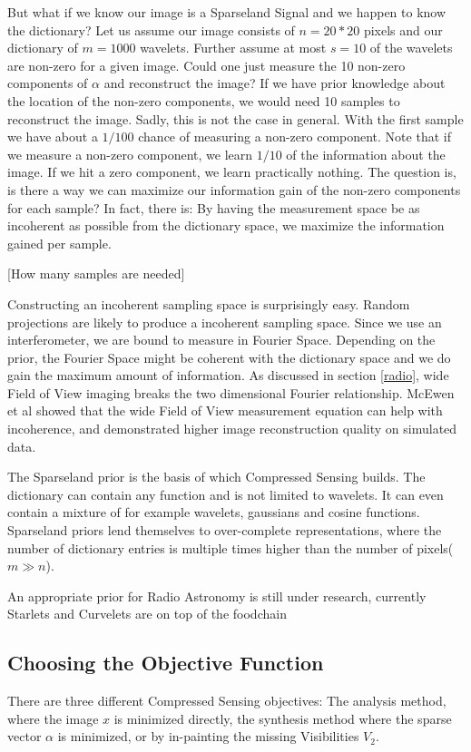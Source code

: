 But what if we know our image is a Sparseland Signal and we happen to know the dictionary? Let us assume our image consists of $n = 20*20$ pixels and our dictionary of $m = 1000$ wavelets. Further assume at most $s=10$ of the wavelets are non-zero for a given image. Could one just measure the 10 non-zero components of $\alpha$ and reconstruct the image? If we have prior knowledge about the location of the non-zero components, we would need 10 samples to reconstruct the image. Sadly, this is not the case in general. With the first sample we have about a $1/100$ chance of measuring a non-zero component. Note that if we measure a non-zero component, we learn $1/10$ of the information about the image. If we hit a zero component, we learn practically nothing. The question is, is there a way we can maximize our information gain of the non-zero components for each sample? In fact, there is: By having the measurement space be  as incoherent as possible from the dictionary space, we maximize the information gained per sample.

[How many samples are needed]

Constructing an incoherent sampling space is surprisingly easy. Random projections are likely to produce a incoherent sampling space. Since we use an interferometer, we are bound to measure in Fourier Space. Depending on the prior, the Fourier Space might be coherent with the dictionary space and we do gain the maximum amount of information. As discussed in section \ref{radio}, wide Field of View imaging breaks the two dimensional Fourier relationship. McEwen et al\cite{mcewen2011compressed} showed that the wide Field of View measurement equation can help with incoherence, and demonstrated higher image reconstruction quality on simulated data.

The Sparseland prior is the basis of which Compressed Sensing builds. The dictionary can contain any function and is not limited to wavelets. It can even contain a mixture of for example wavelets, gaussians and cosine functions. Sparseland priors lend themselves to over-complete representations, where the number of dictionary entries is multiple times higher than the number of pixels($m \gg n$). 

An appropriate prior for Radio Astronomy is still under research, currently Starlets\cite{starck2015starlet} and Curvelets\cite{starck2003astronomical} are on top of the foodchain


\subsection{Choosing the Objective Function}
There are three different Compressed Sensing objectives: The analysis method, where the image $x$ is minimized directly, the synthesis method where the sparse vector $\alpha$ is minimized, or by in-painting the missing Visibilities $V_2$.

